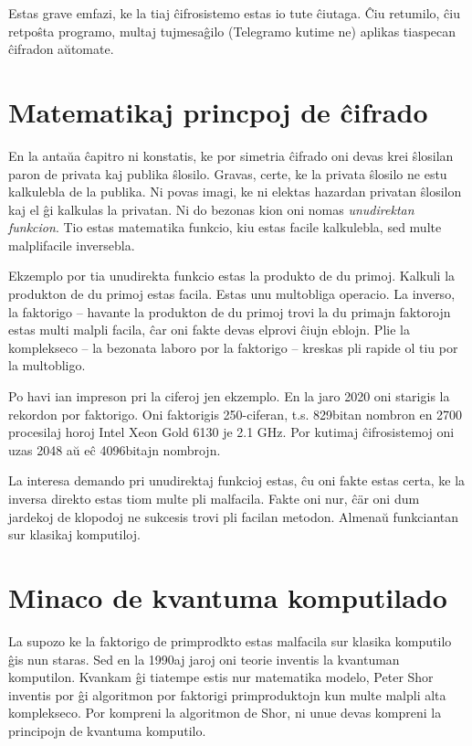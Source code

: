 \documentclass[utf8]{scrartcl}
\begin{document}
Estas grave emfazi, ke la tiaj ĉifrosistemo estas io tute ĉiutaga. Ĉiu
retumilo, ĉiu retpoŝta programo, multaj tujmesaĝilo (Telegramo kutime ne)
aplikas tiaspecan ĉifradon aŭtomate.


\section{Matematikaj princpoj de ĉifrado}

En la antaŭa ĉapitro ni konstatis, ke por simetria ĉifrado oni devas krei
ŝlosilan paron de privata kaj publika ŝlosilo.  Gravas, certe, ke la privata
ŝlosilo ne estu kalkulebla de la publika. Ni povas imagi, ke ni elektas
hazardan privatan ŝlosilon kaj el ĝi kalkulas la privatan. Ni do bezonas kion
oni nomas \emph{unudirektan funkcion}.  Tio estas matematika funkcio, kiu estas
facile kalkulebla, sed multe malplifacile inversebla.

Ekzemplo por tia unudirekta funkcio estas la produkto de du primoj.  Kalkuli la
produkton de du primoj estas facila. Estas unu multobliga operacio.  La
inverso, la faktorigo – havante la produkton de du primoj trovi la du primajn
faktorojn estas multi malpli facila, ĉar oni fakte devas elprovi ĉiujn eblojn.
Plie la komplekseco – la bezonata laboro por la faktorigo – kreskas pli rapide
ol tiu por la multobligo.

Po havi ian impreson pri la ciferoj jen ekzemplo. En la jaro 2020 oni starigis
la rekordon por faktorigo. Oni faktorigis 250-ciferan, t.s. 829bitan nombron en
2700 procesilaj horoj Intel Xeon Gold 6130 je 2.1 GHz.  Por kutimaj
ĉifrosistemoj oni uzas 2048 aŭ eĉ 4096bitajn nombrojn.

La interesa demando pri unudirektaj funkcioj estas, ĉu oni fakte estas certa,
ke la inversa direkto estas tiom multe pli malfacila. Fakte oni nur, ĉär oni
dum jardekoj de klopodoj ne sukcesis trovi pli facilan metodon.  Almenaŭ
funkciantan sur klasikaj komputiloj.


\section{Minaco de kvantuma komputilado}

La supozo ke la faktorigo de primprodkto estas malfacila sur klasika komputilo
ĝis nun staras.  Sed en la 1990aj jaroj oni teorie inventis la kvantuman
komputilon.  Kvankam ĝi tiatempe estis nur matematika modelo, Peter Shor
inventis por ĝi algoritmon por faktorigi primproduktojn kun multe malpli alta
komplekseco.  Por kompreni la algoritmon de Shor, ni unue devas kompreni la
principojn de kvantuma komputilo.
\end{document}

